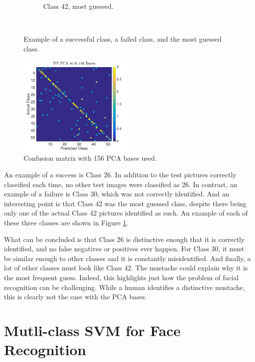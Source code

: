 \documentclass[a4paper, 10pt, conference]{ieeeconf}
\begin{document}
\begin{figure}[!ht]
\begin{subfigure}{0.125\textwidth}
          \caption{Class 42, most guessed.}
        \end{subfigure}
        ~
	\caption{Example of a successful class, a failed class, and the most guessed class. }
  \label{fig:classpics}
\end{figure}

\begin{figure}[!ht]
    \centering
    \includegraphics[width=0.5\textwidth]{src/confusepca.png}
    \caption{Confusion matrix with 156 PCA bases used.}
    \label{fig:confusepca}
\end{figure}

An example of a success is Class 26. In addition to the test pictures correctly classified each time, no other test images were classified as 26. In contrast, an example of a failure is Class 30, which was not correctly identified. And an interesting point is that Class 42 was the most guessed class, despite there being only one of the actual Class 42 pictures identified as such. An example of each of these three classes are shown in Figure \ref{fig:classpics}.

What can be concluded is that Class 26 is distinctive enough that it is correctly identified, and no false negatives or positives ever happen. For Class 30, it must be similar enough to other classes and it is constantly misidentified. And finally, a lot of other classes must look like Class 42. The mustache could explain why it is the most frequent guess. Indeed, this highlights just how the problem of facial recognition can be challenging. While a human identifies a distinctive mustache, this is clearly not the case with the PCA bases. 

\section{Mutli-class SVM for Face Recognition}

\end{document}

